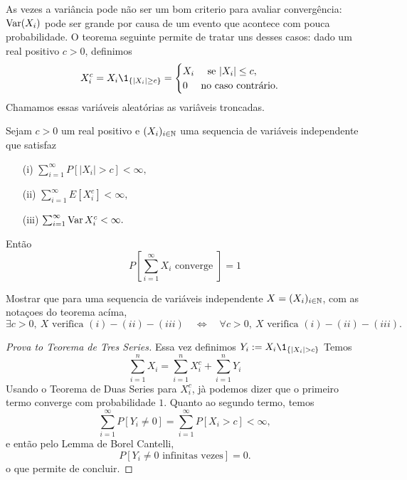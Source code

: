 \begin{topics}
As vezes a variância pode não ser um bom criterio para avaliar convergência: $\operatorname{Var}(X_i)$ pode ser grande por causa de um evento que
acontece com pouca probabilidade. O teorema seguinte permite de tratar uns desses casos:
dado um real positivo $c>0$, definimos
\begin{equation}
X_i^c= X_i \1_{\{|X_i| \ge c\}}= \begin{cases} X_i \quad \text{ se } |X_i|\le c,\\
                                    0 \quad \text{ no caso contrário.}
                                   \end{cases}
           \end{equation}
Chamamos essas variáveis aleatórias as variâveis troncadas.

\begin{theorem}
 Sejam $c>0$ um real positivo e $(X_i)_{i\in {\ensuremath{\mathbb N}}}$ uma sequencia de variáveis independente que
satisfaz
\begin{itemize}
 \item [(i)]  $\sum_{i=1}^\infty P[ |X_i|>c ]<\infty,$
 \item [(ii)]  $\sum_{i=1}^\infty E[ X^c_i]<\infty,$
 \item [(iii)]  $\sum_{i=1}^\infty \operatorname{Var} X^c_i<\infty.$
\end{itemize}
Então
$$ P[\sum_{i=1}^{\infty} X_i \text{ converge } ]= 1 $$
\end{theorem}

\begin{exercise}
  Mostrar que para uma sequencia de variáveis independente $X=(X_i)_{i\in {\ensuremath{\mathbb N}}}$, com as notaçoes do teorema acíma,
  \begin{equation*}
    \exists c>0,\ X \text{ verifica $(i)-(ii)-(iii)$}
    \quad \Leftrightarrow \quad
    \forall c>0,\ X \text{ verifica $(i)-(ii)-(iii)$}.
  \end{equation*}
\end{exercise}

\begin{proof}[Prova to Teorema de Tres Series]
  Essa vez definimos $Y_i:= X_i \1_{\{|X_i| > c\}}$
  Temos
  \begin{equation}
    \sum_{i=1}^n X_i =  \sum_{i=1}^n X_i^c + \sum_{i=1}^n Y_i
  \end{equation}
  Usando o Teorema de Duas Series para $X_i^c$, jà podemos dizer que o primeiro termo converge com probabilidade $1$.
  Quanto ao segundo termo, temos
  \begin{equation}
    \sum_{i = 1}^{\infty} P[Y_i\ne 0]=   \sum_{i=1}^{\infty} P[ X_i>c ]< \infty,
  \end{equation}
  e então pelo Lemma de Borel Cantelli,
  \begin{equation}
    P[ Y_i \ne 0 \text{ infinitas vezes}]=0.
  \end{equation}
  o que permite de concluir.
\end{proof}



\end{topics}
